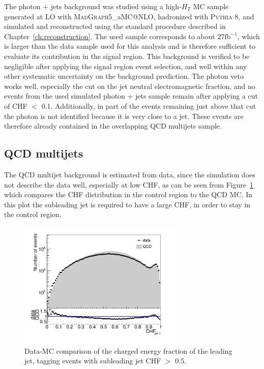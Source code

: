 The photon + jets background was studied using a high-$H_T$ MC sample generated at \ac{LO} with \textsc{MadGraph5\_}a\textsc{MC@NLO}, hadronized with \textsc{Pythia 8}, and simulated and reconstructed using the standard procedure described in Chapter~\ref{ch:reconstruction}. The used sample corresponds to about $27\mathrm{fb}^{-1}$, which is larger than the data sample used for this analysis and is therefore sufficient to evaluate its contribution in the signal region. This background is verified to be negligible after applying the signal region event selection, and well within any other systematic uncertainty on the background prediction. The photon veto works well, especially the cut on the jet neutral electromagnetic fraction, and no events from the used simulated photon + jets sample remain after applying a cut of CHF $<$ 0.1. Additionally, in part of the events remaining just above that cut the photon is not identified because it is very close to a jet. These events are therefore already contained in the overlapping \acs{QCD} multijets sample.

\subsection{QCD multijets}

The \acs{QCD} multijet background is estimated from data, since the simulation does not describe the data well, especially at low CHF, as can be seen from Figure~\ref{fig:dataMC} which compares the CHF distribution in the control region to the \acs{QCD} MC. In this plot the subleading jet is required to have a large CHF, in order to stay in the control region.

\begin{figure}[ht]
  \centering
  \includegraphics[width=0.7\textwidth]{figures/bkgd_estimation_dataMC.pdf}\hfill%
  \caption{Data-MC comparison of the charged energy fraction of the leading jet, tagging events with subleading jet CHF $>$ 0.5.}
  \label{fig:dataMC}
\end{figure}

